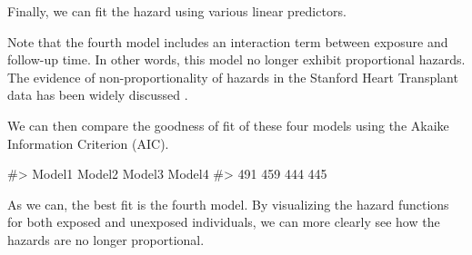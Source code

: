 \documentclass[
]{jss}
\begin{document}
Finally, we can fit the hazard using various linear predictors.

Note that the fourth model includes an interaction term between exposure
and follow-up time. In other words, this model no longer exhibit
proportional hazards. The evidence of non-proportionality of hazards in
the Stanford Heart Transplant data has been widely discussed
\citep{arjas1988graphical}.

We can then compare the goodness of fit of these four models using the
Akaike Information Criterion (AIC).

\begin{CodeChunk}

\begin{CodeOutput}
#> Model1 Model2 Model3 Model4 
#>    491    459    444    445
\end{CodeOutput}
\end{CodeChunk}

As we can, the best fit is the fourth model. By visualizing the hazard
functions for both exposed and unexposed individuals, we can more
clearly see how the hazards are no longer proportional.
\end{document}
